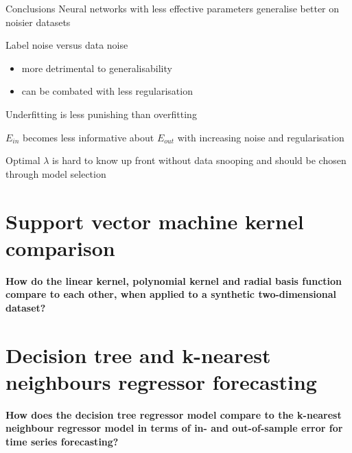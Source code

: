 \documentclass[9.5pt]{beamer}
\begin{document}
    \begin{frame}{Conclusions}
        Neural networks with less effective parameters generalise better on noisier datasets

        Label noise versus data noise
        \begin{itemize}
            \item more detrimental to generalisability
            \item can be combated with less regularisation
        \end{itemize}

        Underfitting is less punishing than overfitting

        $E_{in}$ becomes less informative about $E_{out}$ with increasing noise and regularisation

        Optimal $\lambda$ is hard to know up front without data snooping and should be chosen through model selection
    \end{frame}


    \section{Support vector machine kernel comparison}

    \begin{frame}
        \textbf{How do the linear kernel, polynomial kernel and radial basis function compare to each other, when applied to a synthetic two-dimensional dataset?}
    \end{frame}


    \section{Decision tree and k-nearest neighbours regressor forecasting}
    \begin{frame}
        \textbf{How does the decision tree regressor model compare to the k-nearest neighbour regressor model in terms of in- and out-of-sample error for time series forecasting?}
    \end{frame}
\end{document}
